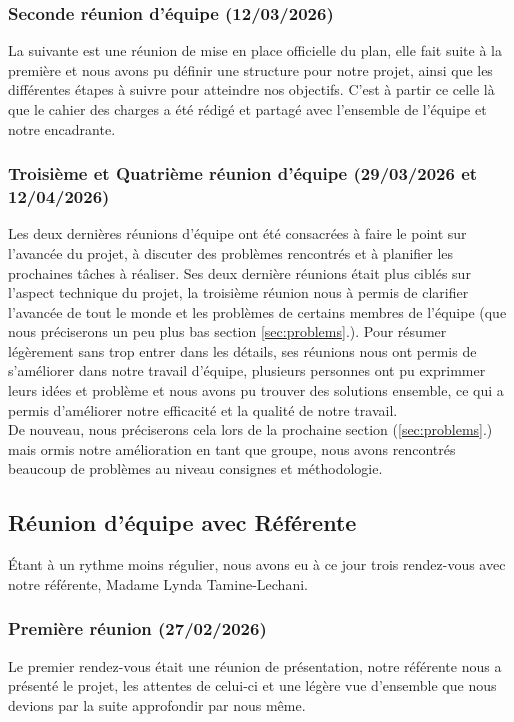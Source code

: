 \documentclass[12pt,a4paper]{article}
\begin{document}
\subsubsection{Seconde réunion d'équipe (12/03/2026)}
La suivante est une réunion de mise en place officielle du plan, elle fait suite à la première et nous avons pu définir une structure pour notre projet,
ainsi que les différentes étapes à suivre pour atteindre nos objectifs. C'est à partir ce celle là que le cahier des charges
a été rédigé et partagé avec l'ensemble de l'équipe et notre encadrante.

\subsubsection{Troisième et Quatrième réunion d'équipe (29/03/2026 et 12/04/2026)}
Les deux dernières réunions d'équipe ont été consacrées à faire le point sur l'avancée du projet, 
à discuter des problèmes rencontrés et à planifier les prochaines tâches à réaliser.
Ses deux dernière réunions était plus ciblés sur l'aspect technique du projet, la troisième réunion nous à permis de clarifier
l'avancée de tout le monde et les problèmes de certains membres de l'équipe (que nous préciserons un peu plus bas section \ref{sec:problems}.).\smallbreak
Pour résumer légèrement sans trop entrer dans les détails, ses réunions nous ont permis de s'améliorer dans notre travail d'équipe,
plusieurs personnes ont pu exprimmer leurs idées et problème et nous avons pu trouver des solutions ensemble,
ce qui a permis d'améliorer notre efficacité et la qualité de notre travail.\\
De nouveau, nous préciserons cela lors de la prochaine section (\ref{sec:problems}.) 
mais ormis notre amélioration en tant que groupe, nous avons rencontrés beaucoup de problèmes au niveau consignes et méthodologie.

\subsection{Réunion d'équipe avec Référente}
Étant à un rythme moins régulier, nous avons eu à ce jour trois rendez-vous avec notre référente, Madame Lynda Tamine-Lechani.
\subsubsection{Première réunion (27/02/2026)}
Le premier rendez-vous était une réunion de présentation, notre référente nous a présenté le projet, les attentes de celui-ci et
une légère vue d'ensemble que nous devions par la suite approfondir par nous même.\smallbreak
\end{document}
